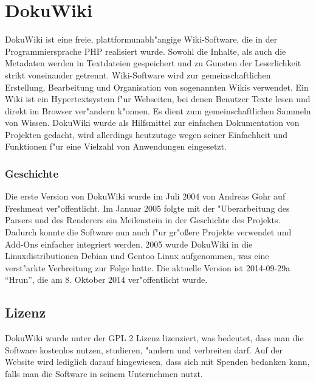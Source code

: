 \section{DokuWiki}
DokuWiki ist eine freie, plattformunabh"angige Wiki-Software, die in der Programmiersprache PHP realisiert wurde. Sowohl die Inhalte, als auch die Metadaten werden in Textdateien gespeichert und zu Gunsten der Leserlichkeit strikt voneinander getrennt. Wiki-Software wird zur gemeinschaftlichen Erstellung, Bearbeitung und Organisation von sogenannten Wikis verwendet. Ein Wiki ist ein Hypertextsystem f"ur Webseiten, bei denen Benutzer Texte lesen und direkt im Browser ver"andern k"onnen. Es dient zum gemeinschaftlichen Sammeln von Wissen. DokuWiki wurde als Hilfsmittel zur einfachen Dokumentation von Projekten gedacht, wird allerdings heutzutage wegen seiner Einfachheit und Funktionen f"ur eine Vielzahl von Anwendungen eingesetzt.
\subsubsection*{Geschichte}
Die erste Version von DokuWiki wurde im Juli 2004 von Andreas Gohr auf Freshmeat ver"offentlicht. Im Januar 2005 folgte mit der "Uberarbeitung des Parsers und des Renderers ein Meilenstein in der Geschichte des Projekts. Dadurch konnte die Software nun auch f"ur gr"oßere Projekte verwendet und Add-Ons einfacher integriert werden. 2005 wurde DokuWiki in die Linuxdistributionen Debian und Gentoo Linux aufgenommen, was eine verst"arkte Verbreitung zur Folge hatte. Die aktuelle Version ist 2014-09-29a "`Hrun"', die am 8. Oktober 2014 ver"offentlicht wurde.
\subsection{Lizenz}
DokuWiki wurde unter der GPL 2 Lizenz lizenziert, was bedeutet, dass man die Software kostenlos nutzen, studieren, "andern und verbreiten darf. Auf der Website wird lediglich darauf hingewiesen, dass sich mit Spenden bedanken kann, falls man die Software in seinem Unternehmen nutzt.
